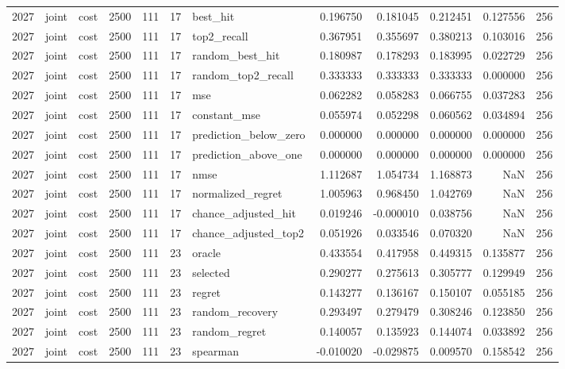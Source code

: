 \begin{tabular}{rllrrrlrrrrr}
2027 & joint & cost & 2500 & 111 & 17 & best_hit & 0.196750 & 0.181045 & 0.212451 & 0.127556 & 256 \\
2027 & joint & cost & 2500 & 111 & 17 & top2_recall & 0.367951 & 0.355697 & 0.380213 & 0.103016 & 256 \\
2027 & joint & cost & 2500 & 111 & 17 & random_best_hit & 0.180987 & 0.178293 & 0.183995 & 0.022729 & 256 \\
2027 & joint & cost & 2500 & 111 & 17 & random_top2_recall & 0.333333 & 0.333333 & 0.333333 & 0.000000 & 256 \\
2027 & joint & cost & 2500 & 111 & 17 & mse & 0.062282 & 0.058283 & 0.066755 & 0.037283 & 256 \\
2027 & joint & cost & 2500 & 111 & 17 & constant_mse & 0.055974 & 0.052298 & 0.060562 & 0.034894 & 256 \\
2027 & joint & cost & 2500 & 111 & 17 & prediction_below_zero & 0.000000 & 0.000000 & 0.000000 & 0.000000 & 256 \\
2027 & joint & cost & 2500 & 111 & 17 & prediction_above_one & 0.000000 & 0.000000 & 0.000000 & 0.000000 & 256 \\
2027 & joint & cost & 2500 & 111 & 17 & nmse & 1.112687 & 1.054734 & 1.168873 & NaN & 256 \\
2027 & joint & cost & 2500 & 111 & 17 & normalized_regret & 1.005963 & 0.968450 & 1.042769 & NaN & 256 \\
2027 & joint & cost & 2500 & 111 & 17 & chance_adjusted_hit & 0.019246 & -0.000010 & 0.038756 & NaN & 256 \\
2027 & joint & cost & 2500 & 111 & 17 & chance_adjusted_top2 & 0.051926 & 0.033546 & 0.070320 & NaN & 256 \\
2027 & joint & cost & 2500 & 111 & 23 & oracle & 0.433554 & 0.417958 & 0.449315 & 0.135877 & 256 \\
2027 & joint & cost & 2500 & 111 & 23 & selected & 0.290277 & 0.275613 & 0.305777 & 0.129949 & 256 \\
2027 & joint & cost & 2500 & 111 & 23 & regret & 0.143277 & 0.136167 & 0.150107 & 0.055185 & 256 \\
2027 & joint & cost & 2500 & 111 & 23 & random_recovery & 0.293497 & 0.279479 & 0.308246 & 0.123850 & 256 \\
2027 & joint & cost & 2500 & 111 & 23 & random_regret & 0.140057 & 0.135923 & 0.144074 & 0.033892 & 256 \\
2027 & joint & cost & 2500 & 111 & 23 & spearman & -0.010020 & -0.029875 & 0.009570 & 0.158542 & 256 \\

\end{tabular}
